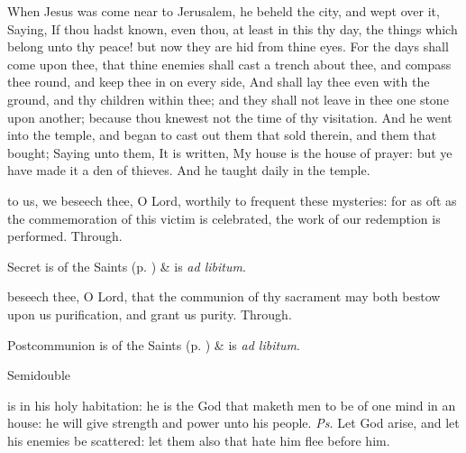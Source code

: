  When Jesus was come near to Jerusalem, he beheld the city, and wept over it, Saying, If thou hadst known, even thou, at least in this thy day, the things which belong unto thy peace! but now they are hid from thine eyes. For the days shall come upon thee, that thine enemies shall cast a trench about thee, and compass thee round, and keep thee in on every side, And shall lay thee even with the ground, and thy children within thee; and they shall not leave in thee one stone upon another; because thou knewest not the time of thy visitation. And he went into the temple, and began to cast out them that sold therein, and them that bought; Saying unto them, It is written, My house is the house of prayer: but ye have made it a den of thieves. And he taught daily in the temple.


\secret
{} to us, we beseech thee, O Lord, worthily to frequent these mysteries: for as oft as the commemoration of this victim is celebrated, the work of our redemption is performed. Through.
\begin{rubric}
     Secret is of the Saints (p. \pageref{SPSaints}) \&  is \emph{ad libitum}.
\end{rubric}


\postcommunion
{} beseech thee, O Lord, that the communion of thy sacrament may both bestow upon us purification, and grant us purity. Through.
\begin{rubric}
     Postcommunion is of the Saints (p. \pageref{SPSaints}) \&  is \emph{ad libitum}.
\end{rubric}



\begin{inhead}
{Semidouble}
\end{inhead}

\properantiphonfix

\introit
{} is in his holy habitation: he is the God that maketh men to be of one mind in an house: he will give strength and power unto his people. \textit{Ps.} Let God arise, and let his enemies be scattered: let them also that hate him flee before him.

